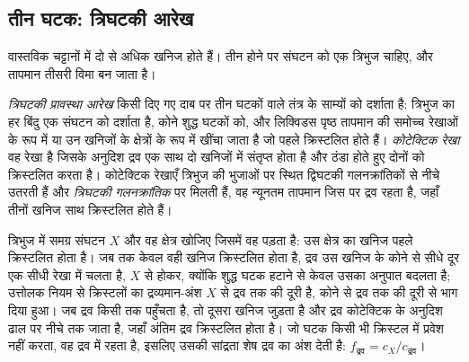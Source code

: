 \subsection*{तीन घटक: त्रिघटकी आरेख}

वास्तविक चट्टानों में दो से अधिक खनिज होते हैं। तीन होने पर संघटन को एक
त्रिभुज चाहिए, और तापमान तीसरी विमा बन जाता है।

\begin{definition}\label{def:b2:mantle-melting:ternary}
\emph{त्रिघटकी प्रावस्था आरेख} किसी दिए गए दाब पर
तीन घटकों वाले तंत्र के साम्यों को दर्शाता है: त्रिभुज का हर बिंदु
एक संघटन को दर्शाता है, कोने शुद्ध घटकों को, और
लिक्विडस पृष्ठ तापमान की समोच्च रेखाओं के रूप में या उन खनिजों के क्षेत्रों के रूप में
खींचा जाता है जो पहले क्रिस्टलित होते हैं। \emph{कोटेक्टिक रेखा}
वह रेखा है जिसके अनुदिश द्रव एक साथ दो खनिजों में संतृप्त होता है और
ठंडा होते हुए दोनों को क्रिस्टलित करता है। कोटेक्टिक रेखाएँ त्रिभुज की भुजाओं पर स्थित द्विघटकी
गलनक्रांतिकों से नीचे उतरती हैं और \emph{त्रिघटकी
गलनक्रांतिक} पर मिलती हैं, वह न्यूनतम तापमान जिस पर द्रव रहता है,
जहाँ तीनों खनिज साथ क्रिस्टलित होते हैं।
\end{definition}

\begin{method}\label{met:b2:mantle-melting:ternary}
त्रिभुज में समग्र संघटन $X$ और वह क्षेत्र खोजिए जिसमें वह पड़ता है:
उस क्षेत्र का खनिज पहले क्रिस्टलित होता है। जब तक केवल वही खनिज क्रिस्टलित होता है,
द्रव उस खनिज के कोने से सीधे दूर एक सीधी रेखा में चलता है,
$X$ से होकर, क्योंकि शुद्ध घटक हटाने से केवल उसका अनुपात बदलता है;
उत्तोलक नियम से क्रिस्टलों का द्रव्यमान-अंश $X$ से द्रव तक की दूरी है,
कोने से द्रव तक की दूरी से भाग दिया हुआ। जब द्रव किसी
 तक पहुँचता है, तो दूसरा खनिज जुड़ता है और द्रव कोटेक्टिक के अनुदिश
ढाल पर नीचे  तक जाता है, जहाँ अंतिम द्रव क्रिस्टलित होता है। जो घटक
किसी भी क्रिस्टल में प्रवेश नहीं करता, वह द्रव में रहता है, इसलिए उसकी सांद्रता
शेष द्रव का अंश देती है: $f_{\text{द्रव}} = c_X/c_{\text{द्रव}}$।
\end{method}

